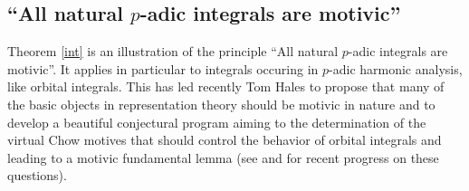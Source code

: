 \documentclass[english,12pt]{amsart}
\theoremstyle{definition}
\theoremstyle{remark}
\theoremstyle{plain}
\numberwithin{equation}{subsection}
\begin{document}
\subsection{``All natural $p$-adic integrals are motivic''}Theorem \ref{int} is an illustration of the principle
``All natural $p$-adic integrals are motivic''. It 
applies in particular to integrals occuring
in $p$-adic harmonic analysis, like orbital integrals.
This has led recently Tom Hales \cite{H1}
to propose that
many of the basic objects in
representation theory should be  motivic in nature and to
develop 
a beautiful conjectural program aiming to the determination
of the virtual Chow motives
that should control the behavior of orbital integrals
and leading to a motivic fundamental lemma  (see
\cite{GH} and \cite{H2} for recent progress on these questions).















\end{document}
